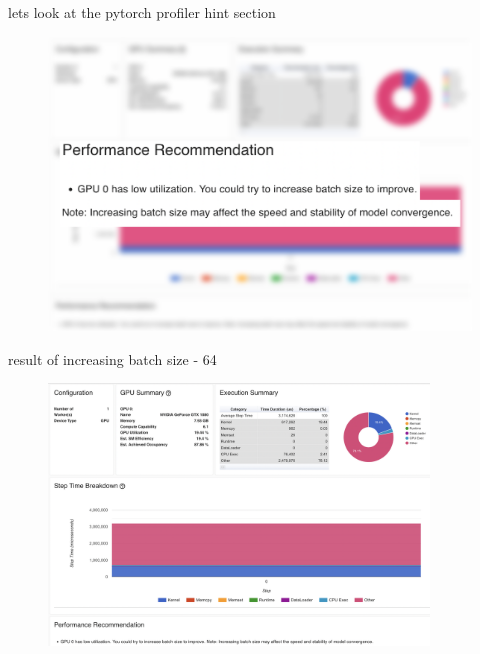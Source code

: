 \documentclass[compress,aspectratio=169]{beamer}
\begin{document}
\begin{frame}{lets look at the pytorch profiler hint section}

\begin{center}
    \begin{figure}
        \includegraphics[width=1\textwidth]{../../data/scap_gtx1080_profiler-torch_14650076_zoom}
    \end{figure}
\end{center}

\end{frame}

\begin{frame}{result of increasing batch size - 64}
	\vspace{-1em}
\begin{center}
    \begin{figure}
        \includegraphics[width=0.9\textwidth]{../../data/scap_gtx1080_profiler-torch_batch-size-64_14650758}
    \end{figure}
    \end{center}

\end{frame}
\end{document}
